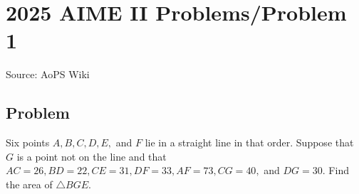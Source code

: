 \documentclass[12pt]{article}
\begin{document}
\section*{{2025 AIME II Problems/Problem 1}}
Source: AoPS Wiki

\subsection*{Problem}
Six points $A, B, C, D, E,$ and $F$ lie in a straight line in that order. Suppose that $G$ is a point not on the line and that $AC=26, BD=22, CE=31, DF=33, AF=73, CG=40,$ and $DG=30.$ Find the area of $\triangle BGE.$
\end{document}
